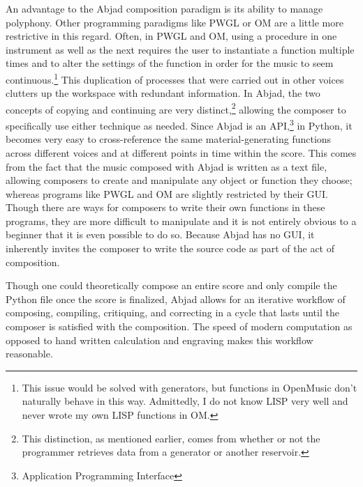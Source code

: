 An advantage to the Abjad composition paradigm is its ability to manage polyphony. Other programming paradigms like PWGL or OM are a little more restrictive in this regard. Often, in PWGL and OM, using a procedure in one instrument as well as the next requires the user to instantiate a function multiple times and to alter the settings of the function in order for the music to seem continuous.\footnote{This issue would be solved with generators, but functions in OpenMusic don't naturally behave in this way. Admittedly, I do not know LISP very well and never wrote my own LISP functions in OM.} This duplication of processes that were carried out in other voices clutters up the workspace with redundant information. In Abjad, the two concepts of copying and continuing are very distinct,\footnote{This distinction, as mentioned earlier, comes from whether or not the programmer retrieves data from a generator or another reservoir.} allowing the composer to specifically use either technique as needed. Since Abjad is an API,\footnote{Application Programming Interface} in Python, it becomes very easy to cross-reference the same material-generating functions across different voices and at different points in time within the score. This comes from the fact that the music composed with Abjad is written as a text file, allowing composers to create and manipulate any object or function they choose; whereas programs like PWGL and OM are slightly restricted by their GUI. Though there are ways for composers to write their own functions in these programs, they are more difficult to manipulate and it is not entirely obvious to a beginner that it is even possible to do so. Because Abjad has no GUI, it inherently invites the composer to write the source code as part of the act of composition.


Though one could theoretically compose an entire score and only compile the Python file once the score is finalized, Abjad allows for an iterative workflow of composing, compiling, critiquing, and correcting in a cycle that lasts until the composer is satisfied with the composition. The speed of modern computation as opposed to hand written calculation and engraving makes this workflow reasonable. 


